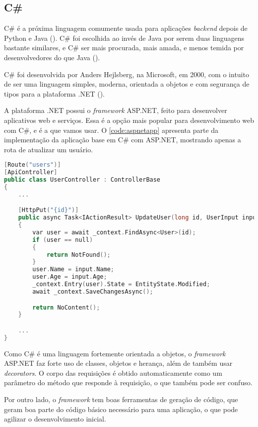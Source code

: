 \subsection{C\#}

C\# é a próxima linguagem comumente usada para aplicações \textit{backend} depois
de Python e Java (\textcite{tiobeindex}). C\# foi escolhida ao invés de Java por
serem duas linguagens bastante similares, e C\# ser mais procurada, mais amada,
e menos temida por desenvolvedores do que Java (\textcite{stackoverflowsurvey}).

C\# foi desenvolvida por Anders Hejlsberg, na Microsoft, em 2000, com o intuito
de ser uma linguagem simples, moderna, orientada a objetos e com segurança de tipos
para a plataforma .NET (\textcite{csharpmanual}).

A plataforma .NET possui o \textit{framework} ASP.NET, feito para desenvolver
aplicativos web e serviços. Essa é a opção mais popular para desenvolvimento web
com C\#, e é a que vamos usar. O \autoref{code:aspnetapp} apresenta parte da implementação
da aplicação base em C\# com ASP.NET, mostrando apenas a rota de atualizar um
usuário.

\begin{lstlisting}[language=C++,label={code:aspnetapp},caption={Aplicação base em C\# com ASP.NET}]
[Route("users")]
[ApiController]
public class UserController : ControllerBase
{
    ...

    [HttpPut("{id}")]
    public async Task<IActionResult> UpdateUser(long id, UserInput input)
    {
        var user = await _context.FindAsync<User>(id);
        if (user == null)
        {
            return NotFound();
        }
        user.Name = input.Name;
        user.Age = input.Age;
        _context.Entry(user).State = EntityState.Modified;
        await _context.SaveChangesAsync();

        return NoContent();
    }

    ...
}
\end{lstlisting}

Como C\# é uma linguagem fortemente orientada a objetos, o \textit{framework} ASP.NET
faz forte uso de classes, objetos e herança, além de também usar \textit{decorators}.
O corpo das requisições é obtido automaticamente como um parâmetro do método que
responde à requisição, o que também pode ser confuso.

Por outro lado, o \textit{framework} tem boas ferramentas de geração de código,
que geram boa parte do código básico necessário para uma aplicação, o que pode
agilizar o desenvolvimento inicial.

